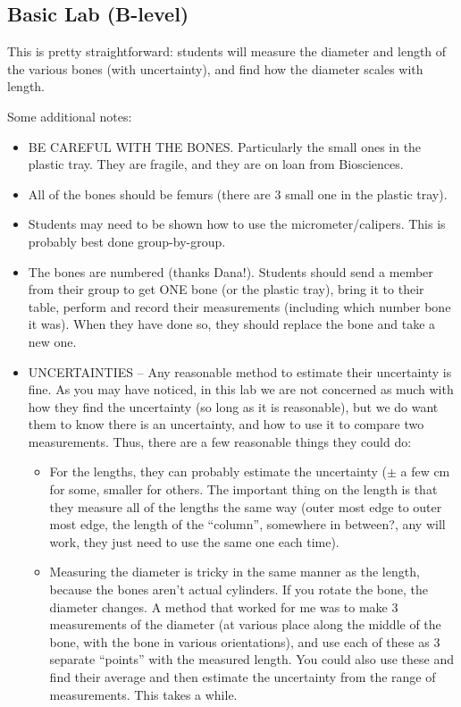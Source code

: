 \documentclass[fleqn,letterpaper]{article}
\begin{document}
\subsection*{Basic Lab (B-level)}

This is pretty straightforward: students will measure the diameter and length of the various bones (with uncertainty), and find how the diameter scales with length.

Some additional notes:

\begin{itemize}
\item{BE CAREFUL WITH THE BONES.  Particularly the small ones in the plastic tray.  They are fragile, and they are on loan from Biosciences.}
\item{All of the bones should be femurs (there are 3 small one in the plastic tray).}
\item{Students may need to be shown how to use the micrometer/calipers.  This is probably best done group-by-group.}
\item{The bones are numbered (thanks Dana!).  Students should send a member from their group to get ONE bone (or the plastic tray), bring it to their table, perform and record their measurements (including which number bone it was).  When they have done so, they should replace the bone and take a new one.}\
\item{UNCERTAINTIES -- Any reasonable method to estimate their uncertainty is fine.  As you may have noticed, in this lab we are not concerned as much with how they find the uncertainty (so long as it is reasonable), but we do want them to know there is an uncertainty, and how to use it to compare two measurements.  Thus, there are a few reasonable things they could do:
  \begin{itemize}
  \item{For the lengths, they can probably estimate the uncertainty ($\pm$ a few cm for some, smaller for others.  The important thing on the length is that they measure all of the lengths the same way (outer most edge to outer most edge, the length of the ``column'', somewhere in between?, any will work, they just need to use the same one each time).}
  \item{Measuring the diameter is tricky in the same manner as the length, because the bones aren't actual cylinders.  If you rotate the bone, the diameter changes.  A method that worked for me was to make 3 measurements of the diameter (at various place along the middle of the bone, with the bone in various orientations), and use each of these as 3 separate ``points'' with the measured length.  You could also use these and find their average and then estimate the uncertainty from the range of measurements.  This takes a while.}

\end{itemize}}
\end{itemize}
\end{document}
